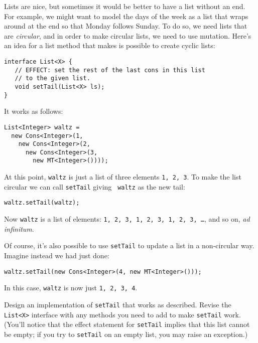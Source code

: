 \documentclass[12pt]{article}                   %
\def\pts#1{\marginpar{\footnotesize \raggedright  \fbox{#1 {\sc Points}}}}
\begin{document}
\begin{problem} \pts{15}

Lists are nice, but sometimes it would be better to have a list
without an end.  For example, we might want to model the days of the
week as a list that wraps around at the end so that Monday follows
Sunday.  To do so, we need lists that are \emph{circular}, and in
order to make circular lists, we need to use mutation.  Here's an idea
for a list method that makes is possible to create cyclic lists:

\begin{verbatim}
interface List<X> {
   // EFFECT: set the rest of the last cons in this list
   // to the given list.
   void setTail(List<X> ls);
}
\end{verbatim}

\noindent
It works as follows:

\begin{verbatim}
List<Integer> waltz =
  new Cons<Integer>(1,
    new Cons<Integer>(2,
      new Cons<Integer>(3,
        new MT<Integer>())));

\end{verbatim}
At this point, {\tt waltz} is just a list of three elements {\tt 1, 2,
  3}.  To make the list circular we can call {\tt setTail} giving {\tt
  waltz} as the new tail:

\begin{verbatim}
waltz.setTail(waltz);
\end{verbatim}

\noindent
Now {\tt waltz} is a list of elements: {\tt 1, 2, 3, 1, 2, 3, 1, 2, 3,
  \dots}, and so on, \emph{ad infinitum}.

Of course, it's also possible to use {\tt setTail} to update a list in
a non-circular way.  Imagine instead we had just done:

\begin{verbatim}
waltz.setTail(new Cons<Integer>(4, new MT<Integer>()));
\end{verbatim}

\noindent
In this case, {\tt waltz} is now just {\tt 1, 2, 3, 4}.

\newpage
Design an implementation of {\tt setTail} that works as described.
Revise the {\tt List<X>} interface with any methods you need to add to
make {\tt setTail} work.  (You'll notice that the effect statement for
{\tt setTail} implies that this list cannot be empty; if you try to
{\tt setTail} on an empty list, you may raise an exception.)



\end{problem}
\end{document}
